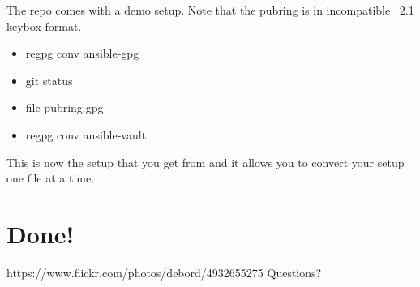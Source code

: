 {  The  repo comes with a demo setup. Note that the
  pubring is in incompatible \gpg\ 2.1 keybox format.

  \begin{itemize}
  \item regpg conv ansible-gpg
  \item git status
  \item file pubring.gpg
  \item regpg conv ansible-vault
  \end{itemize}

  This is now the setup that you get from 
  and it allows you to convert your setup one file at a time.

}



\section{Done!}

       {https://www.flickr.com/photos/debord/4932655275}
       {Questions?}

%

\notes{
  
  
}



